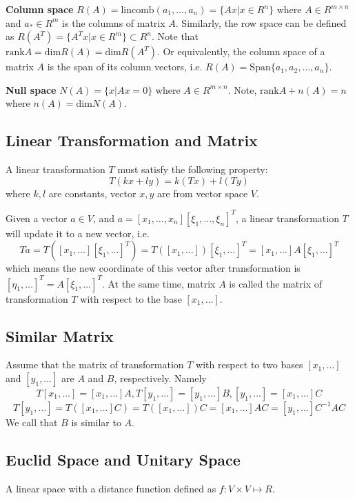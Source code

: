 {\bf Column space} $R(A) = \text{lincomb}(a_1,\ldots,a_n) = \{Ax|x\in R^n\}$
where $A\in R^{m\times n}$ and $a_* \in R^m$ is the columns of matrix $A$.
Similarly, the row space can be defined as
$R(A^T) = \{A^Tx|x\in R^m\} \subset R^n$.
Note that $\text{rank} A = \text{dim} R(A) = \text{dim} R(A^T)$.
Or equivalently, the column space of a matrix $A$ is the span of its column
vectors, i.e. $R(A) = \text{Span}\{a_1,a_2,\ldots,a_n\}$.

{\bf Null space} $N(A) = \{x|Ax=0\}$ where $A\in R^{m\times n}$. Note,
$\text{rank} A + n(A) = n$ where $n(A) = \text{dim} N(A)$.

\subsection{Linear Transformation and Matrix}

A linear transformation $T$ must satisfy the following property:
$$ T(kx + ly) = k(Tx) + l(Ty)$$
where $k, l$ are constants, vector $x, y$ are from vector space $V$.

Given a vector $a \in V$, and $a = [x_1,\ldots,x_n][\xi_1,\ldots,\xi_n]^T$,
a linear transformation $T$ will update it to a new vector, i.e.
$$ Ta = T([x_1,\ldots][\xi_1,\ldots]^T) = T([x_1,\ldots])[\xi_1,\ldots]^T
   = [x_1,\ldots]A[\xi_1,\ldots]^T $$
which means the new coordinate of this vector after transformation is
$[\eta_1,\ldots]^T = A[\xi_1,\ldots]^T$. At the same time, matrix $A$ is
called the matrix of transformation $T$ with respect to the base $[x_1,\ldots]$.

\subsection{Similar Matrix}

Assume that the matrix of transformation $T$ with respect to two bases
$[x_1,\ldots]$ and $[y_1,\ldots]$ are $A$ and $B$, respectively. Namely
$$T[x_1,\ldots] = [x_1,\ldots]A, T[y_1,\ldots] = [y_1,\ldots]B,
                                  [y_1,\ldots] = [x_1,\ldots]C$$
$$T[y_1,\ldots] = T([x_1,\ldots]C) = T([x_1,\ldots])C =
   [x_1,\ldots]AC = [y_1,\ldots]C^{-1}AC $$
We call that $B$ is similar to $A$.

\subsection{Euclid Space and Unitary Space}

A linear space with a distance function defined as $f: V\times V \mapsto R$.
